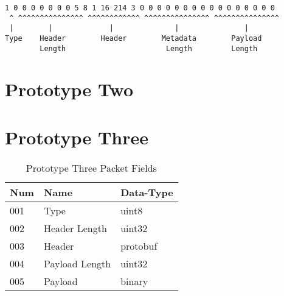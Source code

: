 \begin{lstlisting}[float,caption={Prototype One Example Packet Binary},label=lst:p1d-example-binary]
 1 0 0 0 0 0 0 0 5 8 1 16 214 3 0 0 0 0 0 0 0 0 0 0 0 0 0 0 0 0
 ^ ^^^^^^^^^^^^^^^ ^^^^^^^^^^^^ ^^^^^^^^^^^^^^^ ^^^^^^^^^^^^^^^
 |        |             |              |               |
Type    Header        Header        Metadata        Payload
        Length                       Length         Length
\end{lstlisting}


\section{Prototype Two}


\section{Prototype Three}
\begin{table}[h!]
	\caption{Prototype Three Packet Fields}
	\label{tab:p3d-packet-fields}
	\centering
	\begin{tabular}{ l l l }
		\hline
		\textbf{Num} & \textbf{Name}  & \textbf{Data-Type} \\
		\hline
		001          & Type           & uint8              \\
		\hline
		002          & Header Length  & uint32             \\
		\hline
		003          & Header         & protobuf           \\
		\hline
		004          & Payload Length & uint32             \\
		\hline
		005          & Payload        & binary             \\
		\hline
	\end{tabular}
\end{table}

